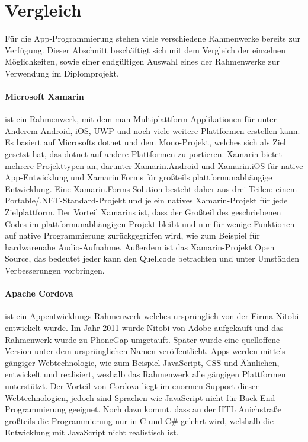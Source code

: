 \section{Vergleich}
Für die App-Programmierung stehen viele verschiedene Rahmenwerke bereits zur Verfügung.
Dieser Abschnitt beschäftigt sich mit dem Vergleich der einzelnen Möglichkeiten, sowie einer endgültigen Auswahl eines der Rahmenwerke zur Verwendung im Diplomprojekt.

\paragraph{Microsoft Xamarin}
ist ein Rahmenwerk, mit dem man Multiplattform-Applikationen für unter Anderem Android, iOS, UWP und noch viele weitere Plattformen erstellen kann.
Es basiert auf Microsofts \ac{dotnet} und dem Mono-Projekt, welches sich als Ziel gesetzt hat, das \ac{dotnet} auf andere Plattformen zu portieren.
Xamarin bietet mehrere Projekttypen an, darunter Xamarin.Android und Xamarin.iOS für native App-Entwicklung und Xamarin.Forms für großteils plattformunabhängige Entwicklung.
Eine Xamarin.Forms-Solution besteht daher aus drei Teilen: einem Portable/.NET-Standard-Projekt und je ein natives Xamarin-Projekt für jede Zielplattform.
Der Vorteil Xamarins ist, dass der Großteil des geschriebenen Codes im plattformunabhängigen Projekt bleibt und nur für wenige Funktionen auf native Programmierung zurückgegriffen wird, wie zum Beispiel für hardwarenahe Audio-Aufnahme.
Außerdem ist das Xamarin-Projekt Open Source, das bedeutet jeder kann den Quellcode betrachten und unter Umständen Verbesserungen vorbringen.

\paragraph{Apache Cordova}
ist ein Appentwicklungs-Rahmenwerk welches ursprünglich von der Firma Nitobi entwickelt wurde.
Im Jahr 2011 wurde Nitobi von Adobe aufgekauft und das Rahmenwerk wurde zu PhoneGap umgetauft.
Später wurde eine quelloffene Version unter dem ursprünglichen Namen veröffentlicht.
Apps werden mittels gängiger Webtechnologie, wie zum Beispiel JavaScript, CSS und Ähnlichen, entwickelt und realisiert, weshalb das Rahmenwerk alle gängigen Plattformen unterstützt.
Der Vorteil von Cordova liegt im enormen Support dieser Webtechnologien, jedoch sind Sprachen wie JavaScript nicht für Back-End-Programmierung geeignet.
Noch dazu kommt, dass an der HTL Anichstraße großteils die Programmierung nur in C und C\# gelehrt wird, welshalb die Entwicklung mit JavaScript nicht realistisch ist.

